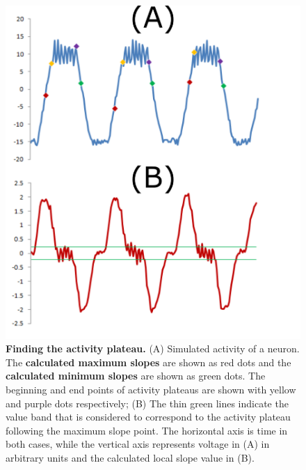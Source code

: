 \begin{figure}[H]
	\begin{center}
		\includegraphics[width=\columnwidth]{graphics/min_max.png}
		\caption[Finding the activity plateau.]{\textbf{Finding the activity plateau.} (A) Simulated activity of a neuron. The \textbf{calculated maximum slopes} are shown as red dots and the \textbf{calculated minimum slopes} are shown as green dots. The beginning  and end points of activity plateaus are shown with yellow and purple dots respectively; (B) The thin green lines indicate the value band that is considered to correspond to the activity plateau following the maximum slope point. The horizontal axis is time in both cases,  while the vertical axis represents voltage in (A) in arbitrary units and the calculated local slope value in (B).}
		\label{fig:min_max_points}
	\end{center}
\end{figure}

